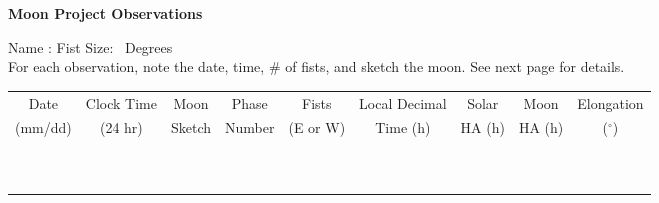\documentclass{article}
\newcommand{\tikzcircle}{\begin{tikzpicture}\draw[black, line width=0.25mm] (0.5,0.5) circle (0.5); \end{tikzpicture}}
\begin{document}
\begin{center}\textbf{Moon Project Observations}\end{center}
Name : \underline{\hphantom{XXXXXXXXXXXXXXXXXXXXXXXX}}\hfill Fist Size: \underline{\hphantom{XXXXXX}}~Degrees\\
For each observation, note the date, time, \# of fists, and sketch the moon. See next page for details.

\begin{center}
\begin{tabular}{|c|c|c|c|c||c|c|c|c|}
\hline
\hphantom{XX}Date\hphantom{XX} & Clock Time & Moon        & Phase  & Fists   & Local Decimal & Solar & Moon  & Elongation\\
(mm/dd)                        & (24 hr)    & Sketch      & Number & (E or W)&  Time (h)     & HA (h)& HA (h)& (${}^\circ$)       \\
\hline
                               &            & \tikzcircle &        &         &                &      &       &           \\
\hline
                               &            & \tikzcircle &        &         &                &      &       &           \\
\hline
                               &            & \tikzcircle &        &         &                &      &       &           \\
\hline
                               &            & \tikzcircle &        &         &                &      &       &           \\
\hline
                               &            & \tikzcircle &        &         &                &      &       &           \\
\hline
                               &            & \tikzcircle &        &         &                &      &       &           \\
\hline
                               &            & \tikzcircle &        &         &                &      &       &           \\
\hline
                               &            & \tikzcircle &        &         &                &      &       &           \\
\hline
                               &            & \tikzcircle &        &         &                &      &       &           \\
\hline
                               &            & \tikzcircle &        &         &                &      &       &           \\

\end{tabular}
\end{center}
\end{document}
